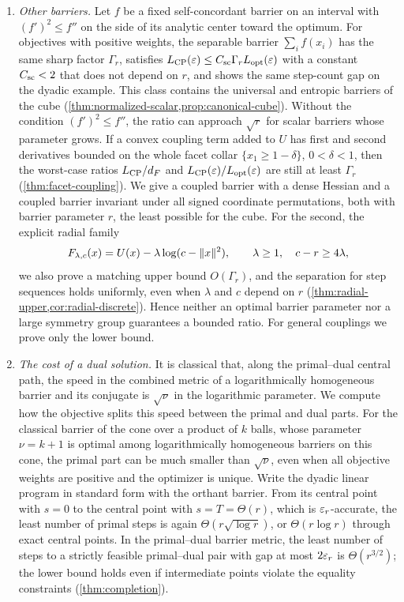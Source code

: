 \begin{enumerate}[leftmargin=*,label=\arabic*.]
\item \emph{Other barriers.}
Let $f$ be a fixed self-concordant barrier on an interval with
$(f')^2\leq f''$ on the side of its analytic center toward the optimum.
For objectives with positive weights, the separable barrier
$\sum_i f(x_i)$ has the same sharp factor $\Gamma_r$, satisfies
$L_{\mathrm{CP}}(\varepsilon)\leq C_{\mathrm{sc}}\Gamma_r L_{\mathrm{opt}}(\varepsilon)$ with a constant
$C_{\mathrm{sc}}<2$ that does not depend on $r$, and shows the same step-count
gap on the dyadic example. This class contains the universal and entropic barriers of the
cube (\cref{thm:normalized-scalar,prop:canonical-cube}). Without the
condition $(f')^2\leq f''$, the ratio can approach $\sqrt r$ for scalar
barriers whose parameter grows.
If a convex coupling term added to $U$ has first and second derivatives
bounded on the whole facet collar $\{x_1\geq1-\delta\}$, $0<\delta<1$,
then the worst-case ratios $L_{\mathrm{CP}}/d_F$ and
$L_{\mathrm{CP}}(\varepsilon)/L_{\mathrm{opt}}(\varepsilon)$ are still at least $\Gamma_r$
(\cref{thm:facet-coupling}). We give a coupled barrier with a dense
Hessian and a coupled barrier invariant under all signed coordinate
permutations, both with barrier parameter $r$, the least possible for
the cube. For the second, the explicit radial family
\[
 F_{\lambda,c}(x)=U(x)-\lambda\log(c-\lVert x\rVert^2),
 \qquad \lambda\geq1,\quad c-r\geq4\lambda,
\]
we also prove a matching upper bound $O(\Gamma_r)$, and the separation
for step sequences holds uniformly, even when $\lambda$ and $c$ depend
on $r$ (\cref{thm:radial-upper,cor:radial-discrete}). Hence neither an
optimal barrier parameter nor a large symmetry group guarantees a
bounded ratio. For general couplings we prove only the lower bound.

\item \emph{The cost of a dual solution.}
It is classical that, along the primal--dual central path, the speed in
the combined metric of a logarithmically homogeneous barrier and its
conjugate is $\sqrt\nu$ in the logarithmic parameter. We compute how
the objective splits this speed between the primal and dual parts. For
the classical barrier of the cone over a product of $k$ balls, whose
parameter $\nu=k+1$ is optimal among logarithmically homogeneous
barriers on this cone, the primal part can be much smaller than
$\sqrt\nu$, even when all objective weights are positive and the
optimizer is unique.
Write the dyadic linear program in standard form with the orthant
barrier. From its central point with $s=0$ to the central point with
$s=T=\Theta(r)$, which is $\varepsilon_r$-accurate, the least number of
primal steps is again
$\Theta(r\sqrt{\log r})$, or $\Theta(r\log r)$ through exact central
points. In the primal--dual barrier metric, the least
number of steps to a strictly feasible primal--dual pair with gap at
most $2\varepsilon_r$ is $\Theta(r^{3/2})$; the lower bound holds even if
intermediate points violate the equality constraints (\cref{thm:completion}).
\end{enumerate}

